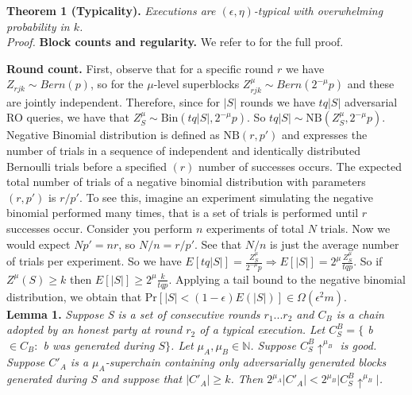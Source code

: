 \textbf{Theorem 1 (Typicality).} \textit{Executions are $(\epsilon, \eta)$-typical  with overwhelming probability in $k$.}\\

\textit{Proof.} \textbf{Block counts and regularity.} We refer to \cite{Backbone} for the full proof.

\textbf{Round count.} First, observe that for a specific round $r$ we have $Z_{rjk} \sim Bern(p)$, so for the $\mu$-level superblocks $Z_{rjk}^\mu \sim Bern(2^{-\mu}p)$ and these are jointly independent. Therefore, since for $\vert S \vert$ rounds we have $tq\vert S \vert$ adversarial RO queries, we have that $Z_S^\mu \sim \text{Bin}(tq \vert S \vert, 2^{-\mu}p)$. So $tq \vert S \vert \sim \text{NB}(Z_S^\mu, 2^{-\mu}p)$. Negative Binomial distribution is defined as $\text{NB}(r, p')$ and expresses the number of trials in a sequence of independent and identically distributed Bernoulli trials before a specified $(r)$ number of successes occurs. The expected total number of trials of a negative binomial distribution with parameters $(r, p')$ is $r/p'$. To see this, imagine an experiment simulating the negative binomial performed many times, that is a set of trials is performed until $r$ successes occur. Consider you perform $n$ experiments of total $N$ trials. Now we would expect $Np' = nr$, so $N/n = r/p'$. See that $N/n$ is just the average number of trials per experiment. So we have $E[tq \vert S \vert] = \frac{Z^\mu_S}{2^{-\mu}p} \Rightarrow E[\vert S \vert] = 2^\mu \frac{Z^\mu_S}{tqp}$. So if $Z^\mu(S) \geq k$ then $E[\vert S \vert] \geq 2^\mu \frac{k}{tqp}$. Applying a tail bound to the negative binomial distribution, we obtain that $\text{Pr}[\vert S \vert < (1 - \epsilon)E(\vert S \vert)] \in \Omega(\epsilon^{2}m)$.  \\

\textbf{Lemma 1.} \textit{Suppose S is a set of consecutive rounds $r_1 ... r_2$ and $C_B$ is a chain adopted by an honest party at round $r_2$ of a typical execution. Let $C^{B}_{S} = \{$ b $\in C_B:$ b was generated during $S\}$. Let $\mu_A, \mu_B \in \mathbb{N}$. Suppose $C^{B}_{S}\uparrow^{\mu_B}$ is good. Suppose $C'_A$ is a $\mu_A$-superchain containing only adversarially generated blocks generated during S and suppose that $\vert C'_A \vert \geq k$. Then $2^{\mu_A} \vert C'_A \vert <  2^{\mu_B} \vert    C^{B}_{S}\uparrow^{\mu_B}\vert $. }\\

